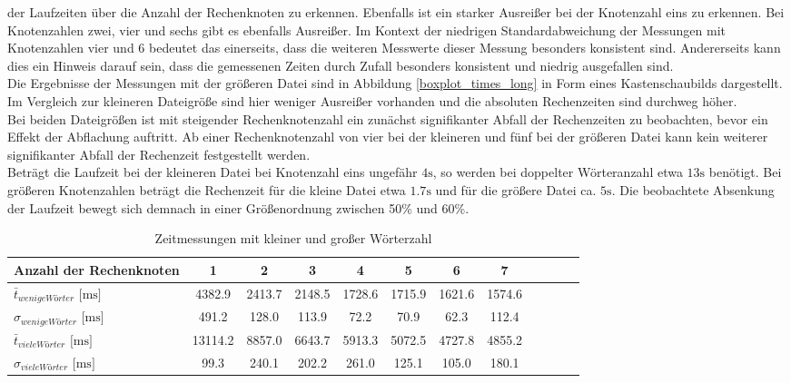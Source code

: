 der Laufzeiten über die Anzahl der Rechenknoten zu erkennen. Ebenfalls ist ein starker Ausreißer bei der Knotenzahl eins zu erkennen. Bei Knotenzahlen zwei, vier und sechs gibt es ebenfalls Ausreißer. Im Kontext der niedrigen Standardabweichung der Messungen mit Knotenzahlen vier und 6 bedeutet das einerseits, dass die weiteren Messwerte dieser Messung besonders konsistent sind. Andererseits kann dies ein Hinweis darauf sein, dass die gemessenen Zeiten durch Zufall besonders konsistent und niedrig ausgefallen sind.
\\
Die Ergebnisse der Messungen mit der größeren Datei sind in Abbildung \ref{boxplot_times_long} in Form eines Kastenschaubilds dargestellt. Im Vergleich zur kleineren Dateigröße sind hier weniger Ausreißer vorhanden und die absoluten Rechenzeiten sind durchweg höher.
\\
Bei beiden Dateigrößen ist mit steigender Rechenknotenzahl ein zunächst signifikanter Abfall der Rechenzeiten zu beobachten, bevor ein Effekt der Abflachung auftritt. Ab einer Rechenknotenzahl von vier bei der kleineren und fünf bei der größeren Datei kann kein weiterer signifikanter Abfall der Rechenzeit festgestellt werden.
\\
Beträgt die Laufzeit bei der kleineren Datei bei Knotenzahl eins ungefähr $4\text{s}$, so werden bei doppelter Wörteranzahl etwa $13\text{s}$ benötigt. Bei größeren Knotenzahlen beträgt die Rechenzeit für die kleine Datei etwa $1.7\text{s}$ und für die größere Datei ca. $5\text{s}$. Die beobachtete Absenkung der Laufzeit bewegt sich demnach in einer Größenordnung zwischen 50\% und 60\%.


\begin{table}
	\caption{Zeitmessungen mit kleiner und großer Wörterzahl}
	\label{zeiten_tabelle_lang_und_kurz}
	\begin{tabularx}{\textwidth}{@{}l*{10}{C}c@{}}
		\toprule
		Anzahl der Rechenknoten & 1 & 2 & 3 & 4 & 5 & 6 & 7 \\ 
		\midrule
		$\bar{t}_{wenige Wörter}$ $\text{[ms]}$ & 4382.9 & 2413.7 & 2148.5 & 1728.6 & 1715.9 & 1621.6 & 1574.6 \\
		$\sigma_{wenige Wörter}$ $\text{[ms]}$ & 491.2 & 128.0 & 113.9 & 72.2 & 70.9 & 62.3 & 112.4 \\
		\addlinespace
		$\bar{t}_{viele Wörter}$ $\text{[ms]}$ & 13114.2 & 8857.0 & 6643.7 & 5913.3 & 5072.5 & 4727.8 & 4855.2 \\
		$\sigma_{viele Wörter}$ $\text{[ms]}$ & 99.3 & 240.1 & 202.2 & 261.0 & 125.1 & 105.0 & 180.1 \\
		\bottomrule
	\end{tabularx}
\end{table}



